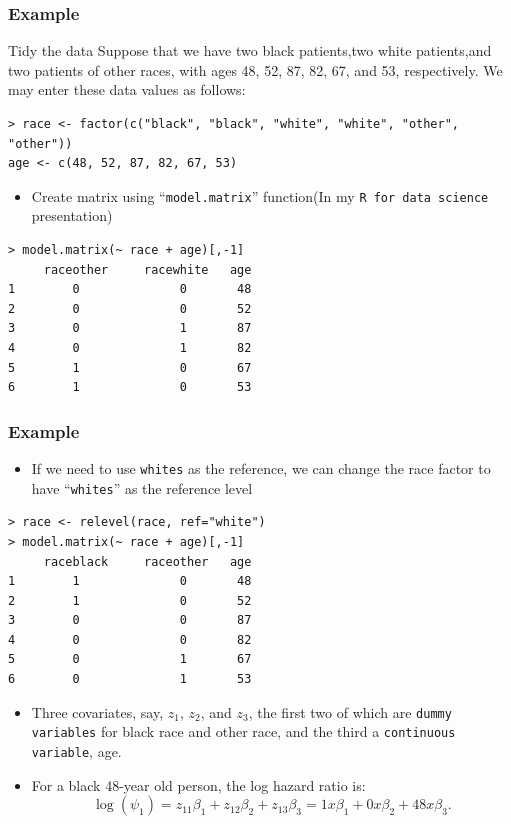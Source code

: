 \documentclass{beamer}
\begin{document}
\pagebreak
\begin{frame}[fragile]
\frametitle{Example}	
\begin{problock}{Tidy the data}
Suppose that we have two black patients,two white patients,and two  patients of other races, with ages 48, 52, 87, 82, 67, and 53, respectively. We may enter these data values as follows:
\end{problock}
\begin{Verbatim}
> race <- factor(c("black", "black", "white", "white", "other", "other"))
age <- c(48, 52, 87, 82, 67, 53)
\end{Verbatim}
\begin{itemize}
\item Create matrix using ``\texttt{model.matrix}'' function(In my \texttt{R for data science} presentation)
\end{itemize}
\begin{Verbatim}
> model.matrix(~ race + age)[,-1]
     raceother     racewhite   age
1        0              0       48
2        0              0       52
3        0              1       87
4        0              1       82
5        1              0       67
6        1              0       53
\end{Verbatim}
\end{frame}

\pagebreak
\begin{frame}[fragile]
\frametitle{Example}	
\begin{itemize}
\item If we need to use \texttt{whites} as the reference, we can change the race factor to have ``\texttt{whites}'' as the reference level
\end{itemize}
\begin{Verbatim}
> race <- relevel(race, ref="white")
> model.matrix(~ race + age)[,-1]
     raceblack     raceother   age
1        1              0       48
2        1              0       52
3        0              0       87
4        0              0       82
5        0              1       67
6        0              1       53
\end{Verbatim}
\begin{itemize}
\item Three covariates, say, $z_1$, $z_2$, and $z_3$, the first two of which are \texttt{dummy variables} for black race and other race, and the third a \texttt{continuous variable}, age.
\item For a black 48-year old person, the {\color{red}log hazard ratio} is:
\begin{equation}
\log(\psi_1) = z_{11}\beta_1 + z_{12}\beta_2 +z_{13}\beta_3 = 1 x \beta_1 + 0 x \beta_2 + 48 x \beta_3. 
\end{equation}
\end{itemize}
\end{frame}
\end{document}
